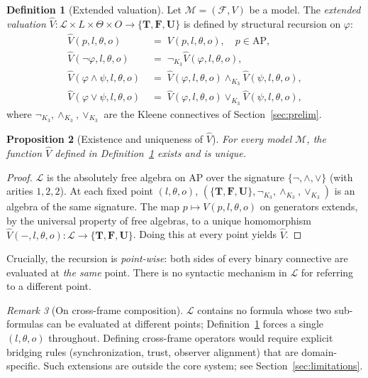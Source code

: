 \documentclass[11pt,a4paper]{article}
\theoremstyle{definition}
\newtheorem{definition}{Definition}
\theoremstyle{plain}
\newtheorem{proposition}[definition]{Proposition}
\theoremstyle{remark}
\newtheorem{remark}[definition]{Remark}
\newcommand{\Tv}{\mathbf{T}}
\newcommand{\Fv}{\mathbf{F}}
\newcommand{\Uv}{\mathbf{U}}
\newcommand{\Vals}{\{\Tv, \Fv, \Uv\}}
\newcommand{\Vh}{\widehat{V}}
\newcommand{\frm}{(l, \theta, o)}
\newcommand{\Lang}{\mathcal{L}}
\newcommand{\AP}{\mathrm{AP}}
\newcommand{\Mod}{\mathcal{M}}
\newcommand{\Frame}{\mathcal{F}}
\begin{document}
\begin{definition}[Extended valuation]
\label{def:extended}
Let $\Mod = (\Frame, V)$ be a model. The \emph{extended valuation}
$\Vh : \Lang \times L \times \Theta \times O \to \Vals$ is defined by
structural recursion on $\varphi$:
\begin{align*}
\Vh(p, l, \theta, o) &\;=\; V(p, l, \theta, o), \quad p \in \AP, \\
\Vh(\lnot\varphi, l, \theta, o) &\;=\; \lnot_{K_3} \Vh(\varphi, l, \theta, o), \\
\Vh(\varphi \land \psi, l, \theta, o) &\;=\; \Vh(\varphi, l, \theta, o)
                                              \land_{K_3} \Vh(\psi, l, \theta, o), \\
\Vh(\varphi \lor \psi, l, \theta, o) &\;=\; \Vh(\varphi, l, \theta, o)
                                              \lor_{K_3} \Vh(\psi, l, \theta, o),
\end{align*}
where $\lnot_{K_3}, \land_{K_3}, \lor_{K_3}$ are the Kleene connectives of
Section~\ref{sec:prelim}.
\end{definition}

\begin{proposition}[Existence and uniqueness of $\Vh$]
\label{prop:unique}
For every model $\Mod$, the function $\Vh$ defined in
Definition~\ref{def:extended} exists and is unique.
\end{proposition}

\begin{proof}
$\Lang$ is the absolutely free algebra on $\AP$ over the signature
$\{\lnot, \land, \lor\}$ (with arities $1, 2, 2$). At each fixed point
$\frm$, $(\Vals, \lnot_{K_3}, \land_{K_3}, \lor_{K_3})$ is an algebra of
the same signature. The map $p \mapsto V(p, l, \theta, o)$ on generators
extends, by the universal property of free algebras, to a unique
homomorphism $\Vh(-, l, \theta, o) : \Lang \to \Vals$. Doing this at every
point yields $\Vh$.
\end{proof}

Crucially, the recursion is \emph{point-wise}: both sides of every binary
connective are evaluated at \emph{the same} point. There is no syntactic
mechanism in $\Lang$ for referring to a different point.

\begin{remark}[On cross-frame composition]
$\Lang$ contains no formula whose two sub-formulas can be evaluated at
different points; Definition~\ref{def:extended} forces a single $\frm$
throughout. Defining cross-frame operators would require explicit
bridging rules (synchronization, trust, observer alignment) that are
domain-specific. Such extensions are outside the core system; see
Section~\ref{sec:limitations}.
\end{remark}
\end{document}
